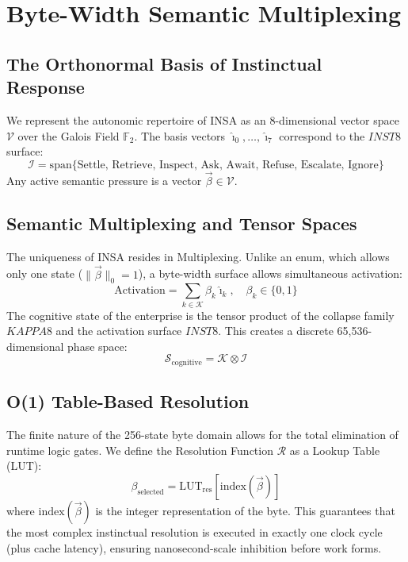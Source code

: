 \documentclass[12pt,a4paper,oneside]{book}
\begin{document}
\chapter{Byte-Width Semantic Multiplexing}

\section{The Orthonormal Basis of Instinctual Response}
We represent the autonomic repertoire of INSA as an 8-dimensional vector space $\mathcal{V}$ over the Galois Field $\mathbb{F}_2$. The basis vectors $\hat{\imath}_0, \dots, \hat{\imath}_7$ correspond to the $INST8$ surface:
\begin{equation}
\mathcal{I} = \text{span}\{ \text{Settle, Retrieve, Inspect, Ask, Await, Refuse, Escalate, Ignore} \}
\end{equation}
Any active semantic pressure is a vector $\vec{\beta} \in \mathcal{V}$.

\section{Semantic Multiplexing and Tensor Spaces}
The uniqueness of INSA resides in Multiplexing. Unlike an enum, which allows only one state ($\|\vec{\beta}\|_0 = 1$), a byte-width surface allows simultaneous activation:
\begin{equation}
\text{Activation} = \sum_{k \in \mathcal{K}} \beta_k \hat{\imath}_k, \quad \beta_k \in \{0, 1\}
\end{equation}
The cognitive state of the enterprise is the tensor product of the collapse family $KAPPA8$ and the activation surface $INST8$. This creates a discrete 65,536-dimensional phase space:
\begin{equation}
\mathcal{S}_{\text{cognitive}} = \mathcal{K} \otimes \mathcal{I}
\end{equation}

\section{O(1) Table-Based Resolution}
The finite nature of the 256-state byte domain allows for the total elimination of runtime logic gates. We define the Resolution Function $\mathcal{R}$ as a Lookup Table (LUT):
\begin{equation}
\beta_{\text{selected}} = \text{LUT}_{\text{res}}[ \text{index}(\vec{\beta}) ]
\end{equation}
where $\text{index}(\vec{\beta})$ is the integer representation of the byte. This guarantees that the most complex instinctual resolution is executed in exactly one clock cycle (plus cache latency), ensuring nanosecond-scale inhibition before work forms.
\end{document}
